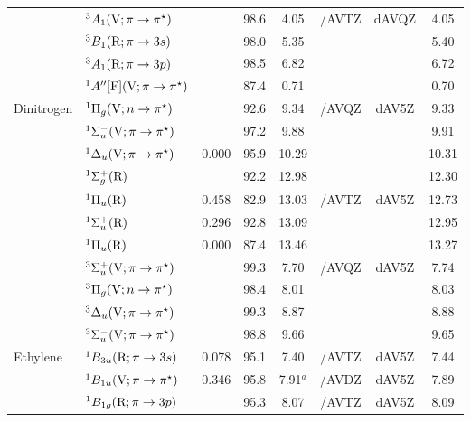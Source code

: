 \begin{tabular}{llcccccc}
                        &$^3A_1 (\mathrm{V};\pi \rightarrow \pi^\star)$				&		&98.6 &4.05		& {\exCI}/AVTZ & dAVQZ		&4.05	\\
                        &$^3B_1 (\mathrm{R};\pi \rightarrow 3s)$ 						&		&98.0 &5.35		&			&			&5.40 	\\
                        &$^3A_1 (\mathrm{R};\pi \rightarrow 3p)$						&		&98.5 &6.82		&			&			&6.72 	\\
                        &$^1A^{\prime\prime} [\mathrm{F}]	(\mathrm{V};\pi \rightarrow \pi^\star)$		&		&87.4 &0.71		& 			 & 			& 0.70 	\\
      Dinitrogen		&$^1\Pi_g (\mathrm{V};n \rightarrow \pi^\star)$ 				&		&92.6 &9.34		& {\exCI}/AVQZ&dAV5Z		&9.33	 \\
                        &$^1\Sigma_u^- (\mathrm{V};\pi \rightarrow \pi^\star)$			&		&97.2 &9.88		&			&			&9.91	 \\
                        &$^1\Delta_u (\mathrm{V};\pi \rightarrow \pi^\star)$ 				& 0.000	&95.9 &10.29		&			&			&10.31	 \\
                        &$^1\Sigma_g^+ (\mathrm{R})$ 								&		&92.2 &12.98		&			&			&12.30	 \\
                        &$^1\Pi_u (\mathrm{R})$ 									& 0.458	&82.9 &13.03		& {\exCI}/AVTZ&dAV5Z		&12.73	 \\
                        &$^1\Sigma_u^+ (\mathrm{R})$ 								& 0.296	&92.8 &13.09		&			&			&12.95	 \\
                        &$^1\Pi_u (\mathrm{R})$ 									& 0.000	&87.4 &13.46		&			&			&13.27	 \\
                        &$^3\Sigma_u^+ (\mathrm{V};\pi \rightarrow \pi^\star)$			&		&99.3 &7.70		& {\exCI}/AVQZ&dAV5Z		&7.74	 \\
                        &$^3\Pi_g (\mathrm{V};n \rightarrow \pi^\star)$ 				&		&98.4 &8.01		&			&			&8.03	 \\
                        &$^3\Delta_u (\mathrm{V};\pi \rightarrow \pi^\star)$ 				&		&99.3 &8.87		&			&			&8.88	 \\
                        &$^3\Sigma_u^- (\mathrm{V};\pi \rightarrow \pi^\star)$			&		&98.8 &9.66		&			&			&9.65	 \\
      Ethylene		&$^1B_{3u} (\mathrm{R};\pi \rightarrow 3s)$ 					& 0.078	&95.1 &7.40		&{\exCI}/AVTZ & dAV5Z		&7.44	 \\
                        &$^1B_{1u} (\mathrm{V};\pi \rightarrow \pi^\star)$ 				& 0.346	&95.8 &7.91$^a$	&{\exCI}/AVDZ& dAV5Z		&7.89	\\
                        &$^1B_{1g} (\mathrm{R};\pi \rightarrow 3p)$ 					&		&95.3 &8.07		& {\exCI}/AVTZ& dAV5Z		&8.09	\\

\end{tabular}
